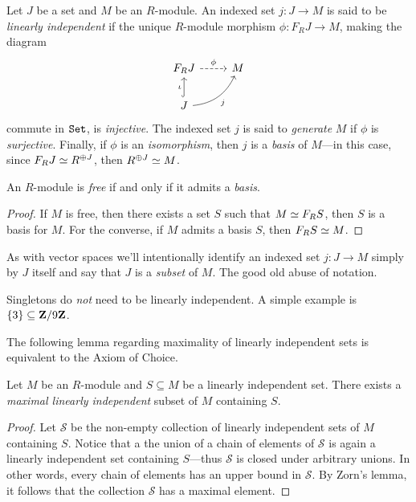 \begin{definition}
\label{def:linear-independent-R-mod}
Let \(J\) be a set and \(M\) be an \(R\)-module. An indexed set \(j: J \to M\)
is said to be \emph{linearly independent} if the unique \(R\)-module morphism
\(\phi: F_R J \to M\), making the diagram
\[
\begin{tikzcd}
F_R J \ar[r, dashed, "\phi"] &M \\
J \ar[u, hook, "\iota"] \ar[ru, bend right, "j"']
\end{tikzcd}
\]
commute in \({\texttt{Set}}\), is \emph{injective}. The indexed set \(j\) is said to
\emph{generate} \(M\) if \(\phi\) is \emph{surjective}. Finally, if \(\phi\) is
an \emph{isomorphism}, then \(j\) is a \emph{basis} of \(M\)---in this case,
since \(F_R J \simeq R^{\oplus J}\), then \(R^{\oplus J} \simeq M\).
\end{definition}

\begin{corollary}
\label{cor:free-iff-basis}
An \(R\)-module is \emph{free} if and only if it admits a \emph{basis}.
\end{corollary}

\begin{proof}
If \(M\) is free, then there exists a set \(S\) such that \(M \simeq F_R S\), then
\(S\) is a basis for \(M\). For the converse, if \(M\) admits a basis \(S\),
then \(F_R S \simeq M\).
\end{proof}

As with vector spaces we'll intentionally identify an indexed set \(j: J \to M\)
simply by \(J\) itself and say that \(J\) is a \emph{subset} of \(M\). The good
old abuse of notation.

\begin{remark}[Singletons]
\label{rem:singletons-arent-LI}
Singletons do \emph{not} need to be linearly independent. A simple example is
\(\{3\} \subseteq \mathbf{Z}/9\mathbf{Z}\).
\end{remark}

The following lemma regarding maximality of linearly independent sets is
equivalent to the Axiom of Choice.

\begin{lemma}[Maximality]
\label{lem:maximal-LI-subset}
Let \(M\) be an \(R\)-module and \(S \subseteq M\) be a linearly independent
set. There exists a \emph{maximal linearly independent} subset of \(M\)
containing \(S\).
\end{lemma}

\begin{proof}
Let \(\mathcal{S}\) be the non-empty collection of linearly independent sets of
\(M\) containing \(S\). Notice that a the union of a chain of elements of
\(\mathcal{S}\) is again a linearly independent set containing \(S\)---thus
\(\mathcal{S}\) is closed under arbitrary unions. In other words, every chain of
elements has an upper bound in \(\mathcal{S}\). By Zorn's lemma, it follows that
the collection \(\mathcal{S}\) has a maximal element.
\end{proof}

